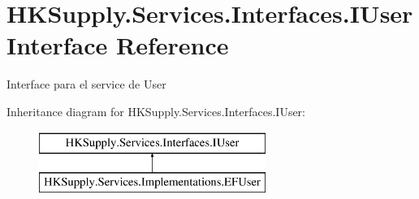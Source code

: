 \hypertarget{interface_h_k_supply_1_1_services_1_1_interfaces_1_1_i_user}{}\section{H\+K\+Supply.\+Services.\+Interfaces.\+I\+User Interface Reference}
\label{interface_h_k_supply_1_1_services_1_1_interfaces_1_1_i_user}


Interface para el service de User  


Inheritance diagram for H\+K\+Supply.\+Services.\+Interfaces.\+I\+User\+:\begin{figure}[H]
\begin{center}
\leavevmode
\includegraphics[height=2.000000cm]{interface_h_k_supply_1_1_services_1_1_interfaces_1_1_i_user}
\end{center}
\end{figure}
